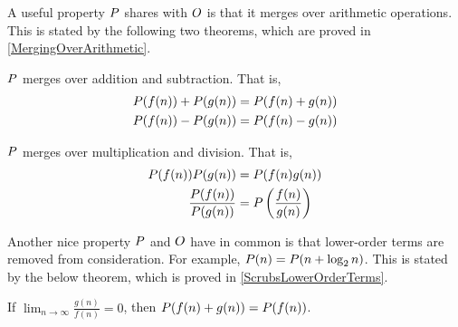 A useful property $P$ shares with $O$ is that it merges over arithmetic operations. This is stated by the following two theorems, which are proved in \ref{MergingOverArithmetic}.

\begin{theorem}
	$P$ merges over addition and subtraction. That is,
	\begin{align*}
	P(f(n)) + P(g(n)) &= P(f(n) + g(n))\\
	P(f(n)) - P(g(n)) &= P(f(n) - g(n))
	\end{align*}
\end{theorem}

\begin{theorem}
	$P$ merges over multiplication and division. That is,
	\begin{align*}
	P(f(n))P(g(n)) &= P(f(n)g(n))\\
	\frac {P(f(n))} {P(g(n))} &= P\left(\frac{f(n)} {g(n)}\right)
	\end{align*}
\end{theorem}

Another nice property $P$ and $O$ have in common is that lower-order terms are removed from consideration. For example, $P(n) = P(n + \log_2 n)$. This is stated by the below theorem, which is proved in \ref{ScrubsLowerOrderTerms}.

\begin{theorem}
	If $\lim_{n \to \infty} \frac{g(n)}{f(n)} = 0$, then $P(f(n) + g(n)) = P(f(n))$.
\end{theorem}
